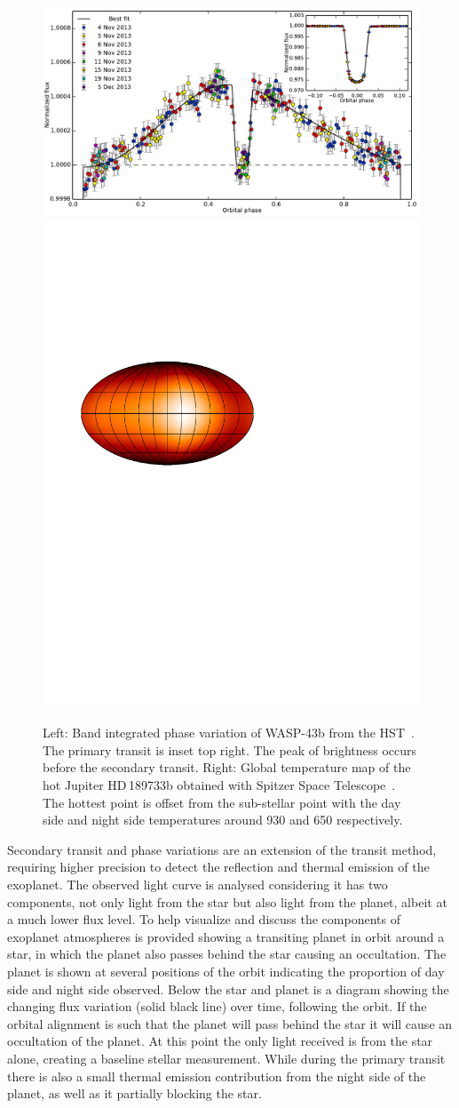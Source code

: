 \begin{figure}
    \centering
    \includegraphics[width=0.5\linewidth]{figures/introduction/stevenson_phasecurve2014.pdf}
    \includegraphics[width=0.4\linewidth]{figures/introduction/knutson_2007_temperature_map_HD_189733b.pdf}
    \caption{Left: Band integrated phase variation of {WASP-43b} from the HST~\citep{stevenson_thermal_2014}.
        The primary transit is inset top right.
        The peak of brightness occurs before the secondary transit.
        Right: Global temperature map of the hot Jupiter HD\,189733b obtained with {Spitzer Space Telescope}~\citep{knutson_map_2007}.
        The hottest point is offset from the sub-stellar point with the day side and night side temperatures around 930\K{} and 650\K{} respectively.}
    \label{fig:phasecurve2014_and_temp_map}
\end{figure}

Secondary transit and phase variations are an extension of the transit method, requiring higher precision to detect the reflection and thermal emission of the exoplanet.
The observed light curve is analysed considering it has two components, not only light from the star but also light from the planet, albeit at a much lower flux level.
To help visualize and discuss the components of exoplanet atmospheres  is provided showing a transiting planet in orbit around a star, in which the planet also passes behind the star causing an occultation.
The planet is shown at several positions of the orbit indicating the proportion of day side and night side observed.
Below the star and planet is a diagram showing the changing flux variation (solid black line) over time, following the orbit.
If the orbital alignment is such that the planet will pass behind the star it will cause an occultation of the planet.
At this point the only light received is from the star alone, creating a baseline stellar measurement.
While during the primary transit there is also a small thermal emission contribution from the night side of the planet, as well as it partially blocking the star.

